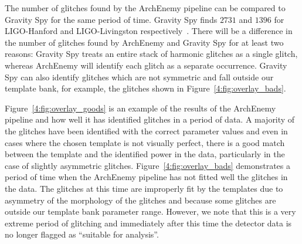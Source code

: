 The number of \scladj glitches found by the ArchEnemy pipeline can be compared to Gravity Spy for the same period of time. Gravity Spy finds $2731$ and $1396$ for LIGO-Hanford and LIGO-Livingston respectively~\cite{gravityspy:2023}. There will be a difference in the number of glitches found by ArchEnemy and Gravity Spy for at least two reasons: Gravity Spy treats an entire stack of harmonic glitches as a single \scladj glitch, whereas ArchEnemy will identify each glitch as a separate occurrence. Gravity Spy can also identify \scladj glitches which are not symmetric and fall outside our template bank, for example, the \scladj glitches shown in Figure~\ref{4:fig:overlay_bads}.

Figure~\ref{4:fig:overlay_goods} is an example of the results of the ArchEnemy pipeline and how well it has identified \scladj glitches in a period of data. A majority of the glitches have been identified with the correct parameter values and even in cases where the chosen template is not visually perfect, there is a good match between the template and the identified power in the data, particularly in the case of slightly asymmetric glitches. Figure~\ref{4:fig:overlay_bads} demonstrates a period of time when the ArchEnemy pipeline has not fitted well the \scladj glitches in the data. The glitches at this time are improperly fit by the templates due to asymmetry of the morphology of the glitches and because some glitches are outside our template bank parameter range. However, we note that this is a very extreme period of \scladj glitching and immediately after this time the detector data is no longer flagged as ``suitable for analysis''.

